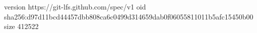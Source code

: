 version https://git-lfs.github.com/spec/v1
oid sha256:d97d11bcd44457dbb808ca6c0499d314659dab0f06055811011b5afc15450b00
size 412522
